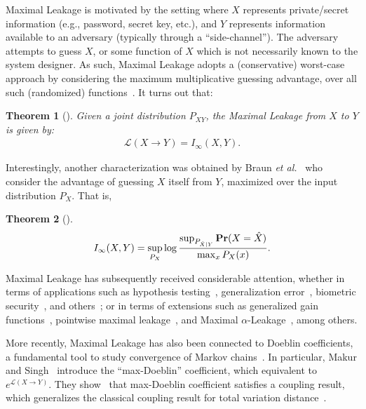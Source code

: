 \documentclass{article}
\newtheorem{theorem}{Theorem}
\numberwithin{theorem}{section}
\numberwithin{example}{section}
\numberwithin{remark}{section}
\numberwithin{definition}{section}
\def\Pr{{\rm \mathbf {Pr}}}
\newcommand{\revised}[1]{{\color{black} #1}}
\begin{document}
\revised{Maximal Leakage is motivated by the setting where $X$ represents private/secret information (e.g., password, secret key, etc.), and $Y$ represents information available to an adversary (typically through a ``side-channel''). The adversary attempts to guess $X$, or some function of $X$ which is not necessarily known to the system designer. As such, Maximal Leakage adopts a (conservative) worst-case approach by considering the maximum multiplicative guessing advantage, over all such (randomized) functions~\cite{MaximalLeakage:20}.}  It turns out that:

\begin{theorem}[{\cite[Theorem 1] {MaximalLeakage:20}}]  \label{thm:max-leakage}
Given a joint distribution $P_{XY}$, the Maximal Leakage from $X$ to $Y$ is given by:
    \begin{align}
        \label{eq:thm-max-leakage}
        \mathcal{L}(X \!\! \to \!\! Y) = I_\infty(X,Y).
    \end{align}
\end{theorem}

Interestingly, another characterization was obtained by Braun \emph{et al.}~\cite{braun:2009} who consider the advantage of guessing $X$ itself from $Y$, maximized over the input distribution $P_X$. That is,
\begin{theorem}[{\cite[Proposition 5.1] {braun:2009}}]  
    \label{thm:max-leakage-additive}
    \begin{align}
        \label{eq:thm-max-leakage-additive} 
        I_\infty(X,Y) = \sup_{P_X} \log \frac{ \sup_{P_{\hat{X}|Y}}  \Pr(X = \hat{X})}{\max_x P_X(x)}.
    \end{align}
\end{theorem}

\revised{Maximal Leakage has subsequently received considerable attention, whether in terms of applications such as hypothesis testing~\cite{LiaoSCT:2017}, generalization error~\cite{EspositoGI:2021}, biometric security~\cite{ShahrezaSM:23}, and others~\cite{EspositoG:22}; or in terms of extensions such as generalized gain functions~\cite{KurriSK:22}, pointwise maximal leakage~\cite{SaeidianCOS:23}, and Maximal $\alpha$-Leakage~\cite{LiaoKSC:19}, among others. }

\revised{More recently, Maximal Leakage has also been connected to Doeblin coefficients, a fundamental tool to study convergence of Markov chains~\cite{makurAS:24}. In particular, Makur and Singh~\cite{makurAS:24} introduce the ``max-Doeblin'' coefficient, which equivalent to $e^{\mathcal{L}(X  \to Y)}$. They show~\cite[Theorem 4]{makurAS:24} that max-Doeblin coefficient satisfies a coupling result, which generalizes the classical coupling result for total variation distance~\cite[Proposition 4.7]{levin2017markov}.} 
\end{document}
